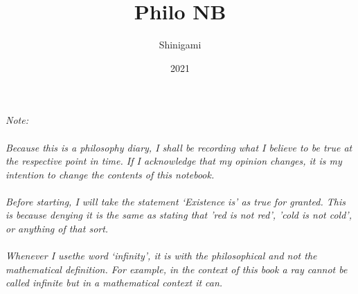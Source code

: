\documentclass{article}
\title{Philo NB}
\author{Shinigami}
\date{2021}
\begin{document}
\maketitle
\textit{Note:}
\\\\\textit{Because this is a philosophy diary, I shall be recording what I believe to be true at the respective point in time. If I acknowledge that my opinion changes, it is my intention to change the contents of this notebook.}
\\\\\textit{Before starting, I will take the statement `Existence is' as true for granted. This is because denying it is the same as stating that 'red is not red', 'cold is not cold', or anything of that sort.}
\\\\\textit{Whenever I usethe word `infinity', it is with the philosophical and not the mathematical definition. For example, in the context of this book a ray cannot be called infinite but in a mathematical context it can.}
\newpage
\end{document}
